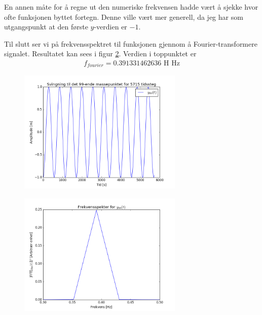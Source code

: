 \documentclass[norsk,a4,12pt,fleqn]{extarticle}
\begin{document}
En annen måte for å regne ut den numeriske
frekvensen hadde vært å sjekke hvor ofte
funksjonen byttet fortegn.
Denne ville vært mer generell, da
jeg har som utgangspunkt at den første
$y$-verdien er $-1$.


Til slutt ser vi på 
frekvensspektret til
funksjonen gjennom
å Fourier-transformere signalet.
Resultatet kan sees i
figur \ref{fig:prob5fourier}.
Verdien i toppunktet
er
\begin{align}
    f_{fourier} = 0.391331462636
    \text{ H Hz}
\end{align}

\begin{figure}[H]
    \label{fig:prob5svingning}
    \centering %
    \includegraphics[width=0.7\textwidth]{../src/problem5-svingning.png}
    \caption{} 
\end{figure} 

\begin{figure}[H]
    \label{fig:prob5fourier}
    \centering %
    \includegraphics[width=0.7\textwidth]{../src/problem5-frekvens.png}
    \caption{} 
\end{figure} 
\end{document}
